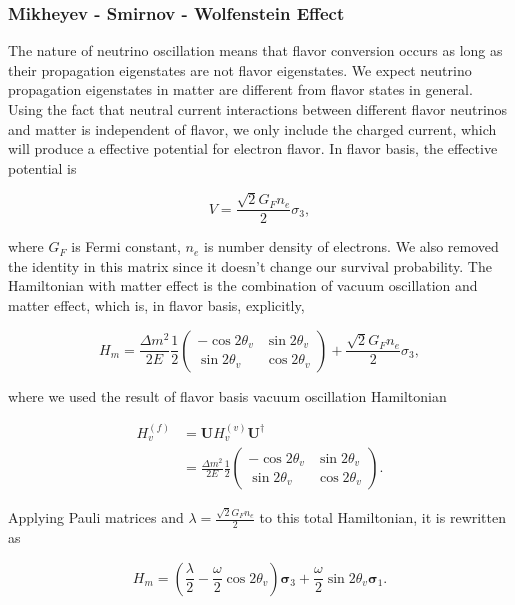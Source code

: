 \subsubsection{Mikheyev - Smirnov - Wolfenstein Effect}

The nature of neutrino oscillation means that flavor conversion occurs as long as their propagation eigenstates are not flavor eigenstates. We expect neutrino propagation eigenstates in matter are different from flavor states in general.\cite{wolf78} Using the fact that neutral current interactions between different flavor neutrinos and matter is independent of flavor, we only include the charged current, which will produce a effective potential for electron flavor. In flavor basis, the effective potential is

\begin{equation}
V=\frac{\sqrt{2}G_F n_e}{2} \sigma_3,
\end{equation}

where $G_F$ is Fermi constant, $n_e$ is number density of electrons. We also removed the identity in this matrix since it doesn't change our survival probability. The Hamiltonian with matter effect is the combination of vacuum oscillation and matter effect, which is, in flavor basis, explicitly,

\begin{equation}
H_m = \frac{ \Delta m^2 }{2E}\frac{1}{2}\begin{pmatrix} -\cos 2\theta_v & \sin 2 \theta_v \\ \sin 2\theta_v & \cos 2\theta_v  \end{pmatrix} + \frac{\sqrt{2}G_F n_e}{2} \sigma_3,
\end{equation}

where we used the result of flavor basis vacuum oscillation Hamiltonian

\begin{align}
H_v^{(f)}& = \mathbf{U} H_v^{(v)}\mathbf{U^\dagger} \\
&= \frac{ \Delta m^2 }{2E}\frac{1}{2}\begin{pmatrix} -\cos 2\theta_v & \sin 2 \theta_v \\ \sin 2\theta_v & \cos 2\theta_v  \end{pmatrix}.
\end{align}

Applying Pauli matrices and $\lambda = \frac{\sqrt{2}G_F n_e}{2}$ to this total Hamiltonian, it is rewritten as

\begin{equation}
H_m = \left(\frac{\lambda}{2} -\frac{ \omega }{2} \cos 2\theta_v \right) \boldsymbol{\sigma}_3  + \frac{ \omega }{2} \sin 2\theta_v \boldsymbol{\sigma}_1.
\end{equation}

